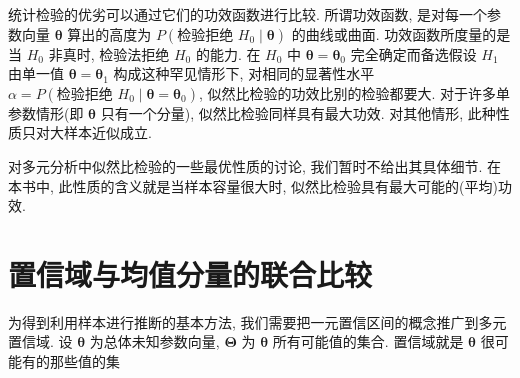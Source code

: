 
统计检验的优劣可以通过它们的功效函数进行比较. 所谓功效函数, 是对每一个参数向量 $\boldsymbol{\theta}$ 算出的高度为 $P(\text{检验拒绝 }H_0\mid\boldsymbol{\theta})$ 的曲线或曲面. 功效函数所度量的是当 $H_0$ 非真时, 检验法拒绝 $H_0$ 的能力. 在 $H_0$ 中 $\boldsymbol{\theta}=\boldsymbol{\theta}_0$ 完全确定而备选假设 $H_1$ 由单一值 $\boldsymbol{\theta}=\boldsymbol{\theta}_1$ 构成这种罕见情形下, 对相同的显著性水平 $\alpha=P(\text{检验拒绝 }H_0\mid\boldsymbol{\theta}=\boldsymbol{\theta}_0)$, 似然比检验的功效比别的检验都要大. 对于许多单参数情形(即 $\boldsymbol{\theta}$ 只有一个分量), 似然比检验同样具有最大功效. 对其他情形, 此种性质只对大样本近似成立.

对多元分析中似然比检验的一些最优性质的讨论, 我们暂时不给出其具体细节. 在本书中, 此性质的含义就是当样本容量很大时, 似然比检验具有最大可能的(平均)功效.

\section{置信域与均值分量的联合比较}  %
\label{sec:5.4}

为得到利用样本进行推断的基本方法, 我们需要把一元置信区间的概念推广到多元置信域. 设 $\boldsymbol{\theta}$ 为总体未知参数向量, $\boldsymbol{\Theta}$ 为 $\boldsymbol{\theta}$ 所有可能值的集合. 置信域就是 $\boldsymbol{\theta}$ 很可能有的那些值的集
